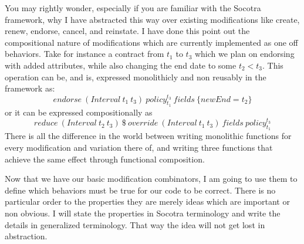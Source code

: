 You may rightly wonder, especially if you are familiar with the Socotra framework, why I have abstracted this
way over existing modifications like create, renew, endorse, cancel, and reinstate. I have done this point out
the compositional nature of modifications which are currently implemented as one off behaviors. Take for instance
a contract from $t_1$ to $t_3$ which we plan on endorsing with added attributes, while also changing the end date
to some $t_2 < t_3$. This operation can be, and is, expressed monolithicly and non reusably in the framework as:
\begin{equation*}
endorse \: (Interval \: t_1 \: t_3) \: policy_{t_1}^{t_3} \: fields \: \{newEnd = t_2\}
\end{equation*}
or it can be expressed compositionally as
\begin{equation*}
reduce \: (Interval \: t_2 \: t_3) \: \$ \: override \: (Interval \: t_1 \: t_3) \: fields \: policy_{t_1}^{t_3}
\end{equation*}
There is all the difference in the world between writing monolithic functions for every modification and variation
there of, and writing three functions that achieve the same effect through functional composition.

Now that we have our basic modification combinators, I am going to use them to define which behaviors must be true
for our code to be correct. There is no particular order to the properties they are merely ideas which are important
or non obvious. I will state the properties in Socotra terminology and write the details in generalized terminology.
That way the idea will not get lost in abstraction.

